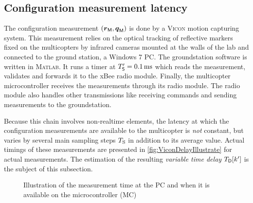 

\subsection{Configuration measurement latency}
The configuration measurement $(\boldsymbol{r}_{\mathsf{M}}, \boldsymbol{q}_{\mathsf{M}})$ is done by a \textsc{Vicon} motion capturing system.
This measurement relies on the optical tracking of reflective markers fixed on the multicopters by infrared cameras mounted at the walls of the lab and connected to the ground station, a Windows 7 PC.
The groundstation software is written in \textsc{Matlab}.
It runs a timer at $T'_{\mathsf{S}} = 0.1\,\text{ms}$ which reads the measurement, validates and forwards it to the xBee radio module.
Finally, the multicopter microcontroller receives the measurements through its radio module.
The radio module also handles other transmissions like receiving commands and sending measurements to the groundstation.

Because this chain involves non-realtime elements, the latency at which the configuration measurements are available to the multicopter is \textit{not} constant, but varies by several main sampling steps $T_{\mathrm{S}}$ in addition to its average value.
Actual timings of these measurements are presented in \autoref{fig:ViconDelayIllustrate} for actual measurements.
The estimation of the resulting \textit{variable time delay} $T_{\mathsf{D}}[k']$ is the subject of this subsection.

\begin{figure}[htb]
 \centering
 
 \caption{Illustration of the measurement time at the PC and when it is available on the microcontroller (MC)}
 \label{fig:ViconDelayClocks}
\end{figure}

